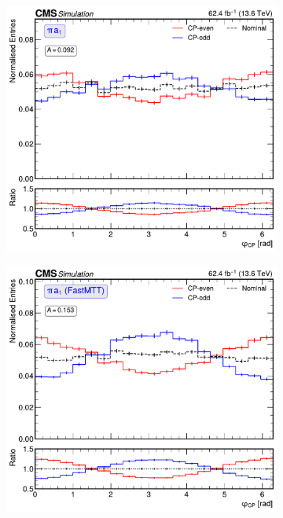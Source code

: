 \begin{figure}[!htbp]
        \centering
        \begin{subfigure}[b]{0.49\textwidth}
            \centering
            \includegraphics[width=\textwidth]{Figures/Chapter7/Acoplanarity/With_IP/aco_pi_a1.pdf}
            \caption{}
        \end{subfigure}
        \begin{subfigure}[b]{0.49\textwidth}
            \centering
            \includegraphics[width=\textwidth]{Figures/Chapter7/Acoplanarity/With_IP/aco_pi_a1_FASTMTT_MassConstraint.pdf}

\end{subfigure}
\end{figure}

